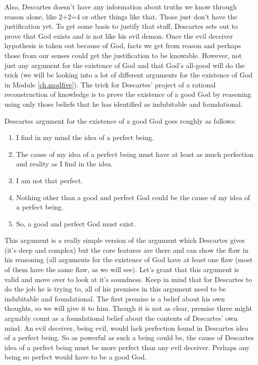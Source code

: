 Also, Descartes doesn't have any information about truths we know through reason alone, like 2+2=4 or other things like that. Those just don't have the justification yet. To get some basis to justify that stuff, Descartes sets out to prove that God exists and is not like his evil demon. Once the evil deceiver hypothesis is taken out because of God, facts we get from reason and perhaps those from our senses could get the justification to be knowable. However, not just any argument for the existence of God and that God's all-good will do the trick (we will be looking into a lot of different arguments for the existence of God in Module \ref{ch.modfive}). The trick for Descartes’ project of a rational reconstruction of knowledge is to prove the existence of a good God by reasoning using only those beliefs that he has identified as indubitable and foundational.

Descartes argument for the existence of a good God goes roughly as follows:
\begin{enumerate}
    \item I find in my mind the idea of a perfect being.
    \item The cause of my idea of a perfect being must have at least as much perfection and reality as I find in the idea.
    \item I am not that perfect.
    \item Nothing other than a good and perfect God could be the cause of my idea of a perfect being.
    \item So, a good and perfect God must exist.
\end{enumerate}
This argument is a really simple version of the argument which Descartes gives (it's deep and complex) but the core features are there and can show the flaw in his reasoning (all arguments for the existence of God have at least one flaw (most of them have the same flaw, as we will see). Let's grant that this argument is valid and move over to look at it's soundness. Keep in mind that for Descartes to do the job he is trying to, all of his premises in this argument need to be indubitable and foundational. The first premise is a belief about his own thoughts, so we will give it to him. Though it is not as clear, premise three might arguably count as a foundational belief about the contents of Descartes' own mind. An evil deceiver, being evil, would lack perfection found in Descartes idea of a perfect being. So as powerful as such a being could be, the cause of Descartes idea of a perfect being must be more perfect than any evil deceiver. Perhaps any being so perfect would have to be a good God.

